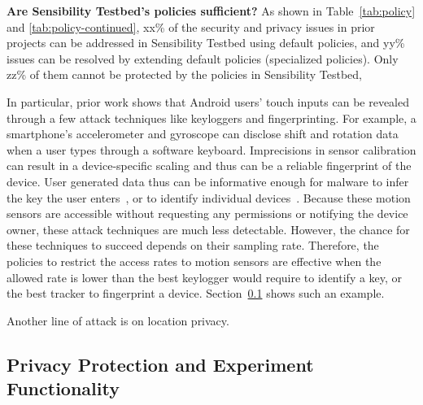 \textbf{Are Sensibility Testbed's policies sufficient?}
As shown in Table~\ref{tab:policy} and \ref{tab:policy-continued}, xx\% of the security and privacy
issues in prior projects can be addressed in Sensibility Testbed using
default policies, and yy\% issues can be resolved by extending 
default policies (specialized policies). Only zz\% of them cannot
be protected by the policies in Sensibility Testbed, 

In particular, prior work shows 
that Android users' touch inputs can be revealed through a few attack 
techniques like keyloggers and fingerprinting. For example, a smartphone's accelerometer 
and gyroscope can disclose shift and rotation data when a user types 
through a software keyboard. Imprecisions in sensor calibration can 
result in a device-specific scaling and thus can be a reliable fingerprint 
of the device. User generated data thus can be informative enough 
for malware to infer the key the user enters~\cite{cai2011touchlogger, 
owusu2012accessory}, or to identify individual devices~\cite{bojinov2014mobile, 
dey2014accelprint}. Because these motion sensors are accessible 
without requesting any 
permissions or notifying the device owner, these attack techniques are much 
less detectable. However, the chance for these techniques to succeed
depends on their sampling rate. 
Therefore, the policies to restrict the access rates to motion sensors 
are effective when the allowed rate is lower than the best keylogger 
would require to identify a key, or the best tracker to fingerprint a device.
Section~\ref{sec-experiment} shows such an example. 

Another line of attack is on location privacy. 


\subsection{Privacy Protection and Experiment Functionality}\label{sec-experiment}

